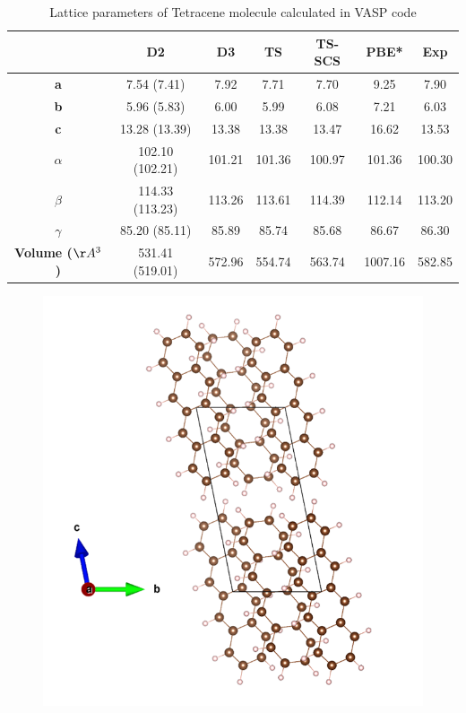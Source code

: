 \begin{table}[htb]
 	\caption{Lattice parameters of Tetracene molecule calculated in VASP code}
 	\begin{center}
 		\begin{tabular}{c c c c c c c}
 			\toprule
 			 & \textbf{D2} & \textbf{D3} & \textbf{TS} & \textbf{TS-SCS} & \textbf{PBE*} & \textbf{Exp} \\
 			 \midrule
 			 \textbf{a} &7.54 (7.41) &  7.92 & 7.71 & 7.70 & 9.25 & 7.90\\
 			 \textbf{b}& 5.96 (5.83) & 6.00 & 5.99 & 6.08 & 7.21 & 6.03 \\
 			 \textbf{c}& 13.28 (13.39) & 13.38 & 13.38 & 13.47 & 16.62 & 13.53 \\
 			 \textbf{$\alpha$} & 102.10 (102.21) & 101.21 & 101.36 & 100.97 & 101.36 &100.30\\
 			 \textbf{$\beta$} & 114.33 (113.23) & 113.26 & 113.61 & 114.39 & 112.14 & 113.20\\
 			 \textbf{$\gamma$} &85.20 (85.11) & 85.89 & 85.74 & 85.68 & 86.67 & 86.30\\
 			 \textbf{Volume ($\AA^{3}$)} & 531.41 (519.01) & 572.96 & 554.74 &  563.74 & 1007.16 & 582.85\\
 			 \bottomrule
 		\end{tabular}
 	\end{center}
 \end{table}
 
 \begin{figure}[h]
 	\centering
 	\includegraphics[scale=0.7]{image/T-a}
 \end{figure}
 
